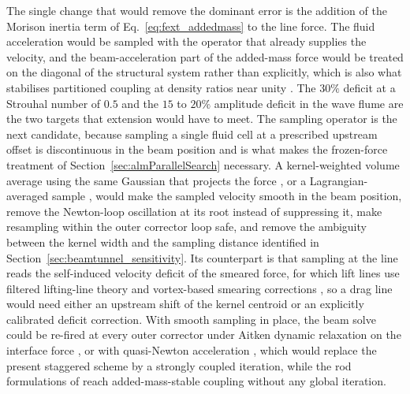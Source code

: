 \noindent
The single change that would remove the dominant error is the addition of the Morison inertia term of Eq.~\eqref{eq:fext_addedmass} to the line force. The fluid acceleration would be sampled with the operator that already supplies the velocity, and the beam-acceleration part of the added-mass force would be treated on the diagonal of the structural system rather than explicitly, which is also what stabilises partitioned coupling at density ratios near unity \citep{causin_addedmass_2005,forster_artificial_2007}. The $30\%$ deficit at a Strouhal number of $0.5$ and the $15$ to $20\%$ amplitude deficit in the wave flume are the two targets that extension would have to meet. The sampling operator is the next candidate, because sampling a single fluid cell at a prescribed upstream offset is discontinuous in the beam position and is what makes the frozen-force treatment of Section~\ref{sec:almParallelSearch} necessary. A kernel-weighted volume average using the same Gaussian that projects the force \citep{churchfield_advanced_2017,merabet_parametric_2019,muscari_effective_2024}, or a Lagrangian-averaged sample \citep{xie_actuatorline_2021}, would make the sampled velocity smooth in the beam position, remove the Newton-loop oscillation at its root instead of suppressing it, make resampling within the outer corrector loop safe, and remove the ambiguity between the kernel width and the sampling distance identified in Section~\ref{sec:beamtunnel_sensitivity}. Its counterpart is that sampling at the line reads the self-induced velocity deficit of the smeared force, for which lift lines use filtered lifting-line theory \citep{martinez_tossas_filtered_2019} and vortex-based smearing corrections \citep{meyerforsting_vortexbased_2019,kleine_noniterative_2023}, so a drag line would need either an upstream shift of the kernel centroid or an explicitly calibrated deficit correction. With smooth sampling in place, the beam solve could be re-fired at every outer corrector under Aitken dynamic relaxation on the interface force \citep{kuttler_fixedpoint_2008}, or with quasi-Newton acceleration \citep{degroote_performance_2010}, which would replace the present staggered scheme by a strongly coupled iteration, while the rod formulations of \citet{tschisgale_immersed_2020,tschisgale_large_2021} reach added-mass-stable coupling without any global iteration.

